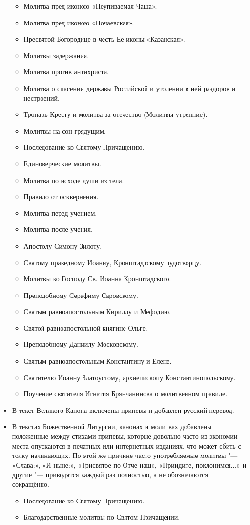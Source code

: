 \begin{itemize}
\begin{itemize}
\item Молитва пред иконою «Неупиваемая Чаша».
\item Молитва пред иконою «Почаевская».
\item Пресвятой Богородице в честь Ее иконы «Казанская».
\item Молитвы задержания.
\item Молитва против антихриста.
\item Молитва о спасении державы Российской и утолении в ней раздоров и нестроений.
\item Тропарь Кресту и молитва за отечество (Молитвы утренние).
\item Молитвы на сон грядущим.
\item Последование ко Святому Причащению.
\item Единоверческие молитвы.
\item Молитва по исходе души из тела.
\item Правило от осквернения.
\item Молитва перед учением.
\item Молитва после учения.
\item Апостолу Симону Зилоту.
\item Святому праведному Иоанну, Кронштадтскому чудотворцу.
\item Молитвы ко Господу Св. Иоанна Кронштадского.
\item Преподобному Серафиму Саровскому.
\item Святым равноапостольным Кириллу и  Мефодию.
\item Святой равноапостольной княгине Ольге.
\item Преподобному Даниилу Московскому.
\item Святым равноапостольным Константину и Елене.
\item Святителю Иоанну Златоустому, архиепископу Константинопольскому.
\item Поучение святителя Игнатия Брянчанинова о молитвенном правиле.
\end{itemize}

\item В текст Великого Канона включены припевы и добавлен русский перевод.

\item В текстах Божественной Литургии, канонах и молитвах добавлены положенные между стихами припевы, которые довольно часто из экономии места опускаются в печатных или интернетных изданиях, что может сбить с толку начинающих. По этой же причине часто употребляемые молитвы "--- «Слава:», «И ныне:», «Трисвятое по Отче наш», «Приидите, поклонимся...» и другие "--- приводятся каждый раз полностью, а не обозначаются сокращённо.

\begin{itemize}
\item Последование ко Святому Причащению.
\item Благодарственные молитвы по Святом Причащении.
\end{itemize}

\end{itemize}

